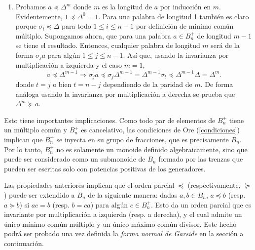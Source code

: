 \documentclass[bibtex, anon]{TEMat-article}
\begin{document}
\begin{demostracion}
\begin{enumerate}
		
		\item Probamos $a\preccurlyeq\Delta^m$ donde $m$ es la longitud de $a$ por inducción en $m$. Evidentemente, $1\preccurlyeq\Delta^0=1$. Para una palabra de longitud 1 también es claro porque $\sigma_i\preccurlyeq\Delta$ para todo $1\leq i\leq n-1$ por definición de mínimo común múltiplo. Supongamos ahora, que para una palabra $a\in B_n^+$ de longitud $m-1$ se tiene el resultado. Entonces, cualquier palabra de longitud $m$ será de la forma $\sigma_j a$ para algún $1\leq j\leq n-1$. Así que, usando la invarianza por multiplicación a izquierda y el caso $m=1$,
		\[
		a\preccurlyeq\Delta^{m-1}\Rightarrow \sigma_j a\preccurlyeq \sigma_j\Delta^{m-1} =\Delta^{m-1}\sigma_t\preccurlyeq \Delta^{m-1}\Delta=\Delta^{m}.
		\]
		donde $t=j$ o bien $t=n-j$ dependiendo de la paridad de $m$. De forma análoga usando la invarianza por multiplicación a derecha se prueba que $\Delta^m\succcurlyeq a$.
	\end{enumerate}
	
\end{demostracion}



Esto tiene importantes implicaciones. Como todo par de elementos de $B_n^+$ tiene un múltiplo común y $B_n^+$ es cancelativo, las condiciones de Ore (\cref{condiciones}) implican que $B_n^+$ se inyecta en su grupo de fracciones, que es precisamente $B_n$. Por lo tanto, $B_n^+$ no es solamente un monoide definido algebraicamente, sino que puede ser considerado como un submonoide de $B_n$ formado por las trenzas que pueden ser escritas solo con potencias positivas de los generadores. 

Las propiedades anteriores implican que el orden parcial $\preccurlyeq$ (respectivamente, $\succcurlyeq$) puede ser extendido a $B_n$ de la siguiente manera: dadas $a,b\in B_n$, $a\preccurlyeq b$ (resp. $a\succcurlyeq b$) si $ac=b$ (resp. $b=ca$) para algún $c\in B_n^+$. Esto da un orden parcial que es invariante por multiplicación a izquierda (resp. a derecha), y el cual admite un único mínimo común múltiplo y un único máximo común divisor. Este hecho podrá ser probado una vez definida la \emph{forma normal de Garside} en la sección a continuación.
\end{document}
